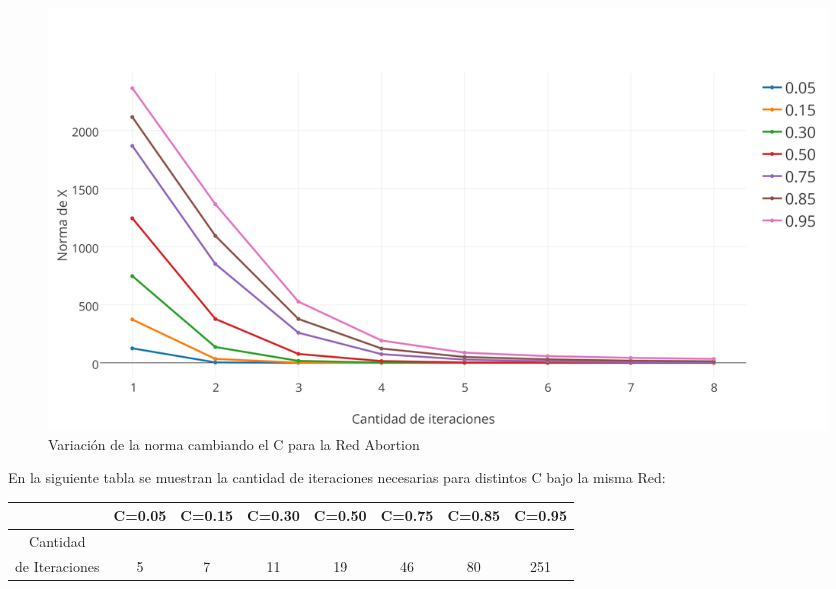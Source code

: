 \documentclass[a4paper]{article}
\begin{document}
\begin{figure}[h!]
  \begin{center}
	\includegraphics[scale=0.50]{imagenes/exp12/abortionPAGERANK.png}
	\caption{Variaci\'on de la norma cambiando el C para la Red Abortion}
	\label{nombreparareferenciar}
  \end{center}
\end{figure}
En la siguiente tabla se muestran la cantidad de iteraciones necesarias para distintos C bajo la misma Red: \\
 \begin{tabular}[c]{|c|c|c|c|c|c|c|c|}
\hline
 & C=0.05 & C=0.15 & C=0.30 & C=0.50 & C=0.75 & C=0.85 & C=0.95 \\
\hline
Cantidad &  & & & & & & \\ 
de Iteraciones & 5 & 7 & 11 & 19 & 46 & 80 & 251 \\
\hline
	\end{tabular}\\\\
\newpage
\end{document}
